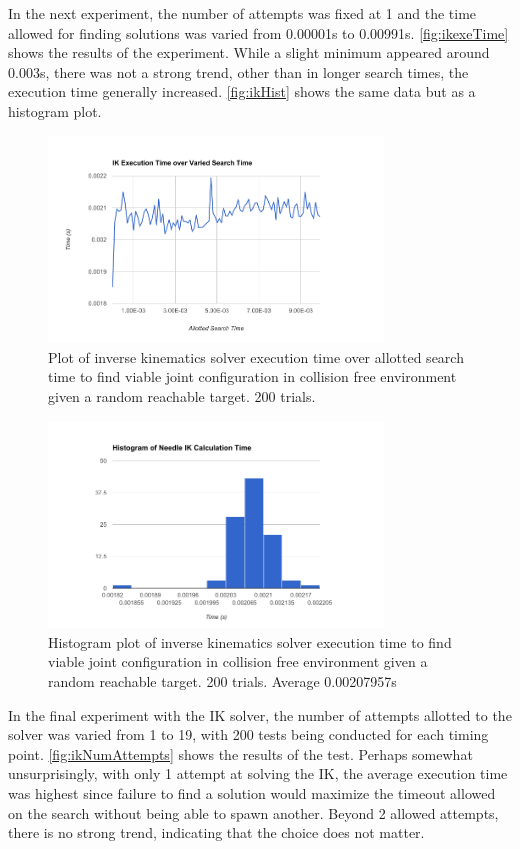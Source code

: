 \documentclass[12pt]{report}
\begin{document}
In the next experiment, the number of attempts was fixed at 1 and the time allowed for finding solutions was varied from 0.00001s to 0.00991s. \autoref{fig:ikexeTime} shows the results of the experiment. While a slight minimum appeared around 0.003s, there was not a strong trend, other than in longer search times, the execution time generally increased. \autoref{fig:ikHist} shows the same data but as a histogram plot.

\begin{figure}[thpb]
	\centering
	\includegraphics[width = 3.5in]{graphs/ik_exec_time_over_allowed.png}
    \caption{Plot of inverse kinematics solver execution time over allotted search time to find viable joint configuration in collision free environment given a random reachable target. 200 trials.}
    \label{fig:ikexeTime}
\end{figure}

\begin{figure}[thpb]
	\centering
	\includegraphics[width = 3.5in]{graphs/ik_hist_1_attempt.png}
    \caption{Histogram plot of inverse kinematics solver execution time to find viable joint configuration in collision free environment given a random reachable target. 200 trials. Average 0.00207957s}
    \label{fig:ikHist}
\end{figure}

In the final experiment with the IK solver, the number of attempts allotted to the solver was varied from 1 to 19, with 200 tests being conducted for each timing point. \autoref{fig:ikNumAttempts} shows the results of the test. Perhaps somewhat unsurprisingly, with only 1 attempt at solving the IK, the average execution time was highest since failure to find a solution would maximize the timeout allowed on the search without being able to spawn another. Beyond 2 allowed attempts, there is no strong trend, indicating that the choice does not matter.
\end{document}
